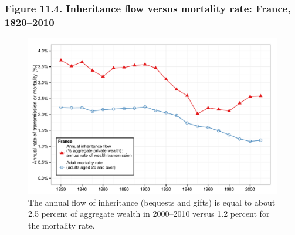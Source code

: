 \documentclass[t]{beamer}\usepackage[]{graphicx}\usepackage[]{color}
\newenvironment{knitrout}{}{} %
\begin{document}
\begin{frame}[label=Figure_11_4]
\frametitle{Figure 11.4. Inheritance flow versus mortality rate: France, 1820--2010}
\begin{figure}[t]
\begin{minipage}[b]{\textwidth}
\centering
\begin{knitrout}\footnotesize
{}\color{fgcolor}

{\centering \includegraphics[width=1\linewidth]{figures/color/Figure_11_4} 

}



\end{knitrout}
\caption{The annual flow of inheritance (bequests and gifts) is equal to about 2.5 percent of aggregate wealth in 2000--2010 versus 1.2 percent for the mortality rate.}
\end{minipage}
\end{figure}
\end{frame}
\end{document}
